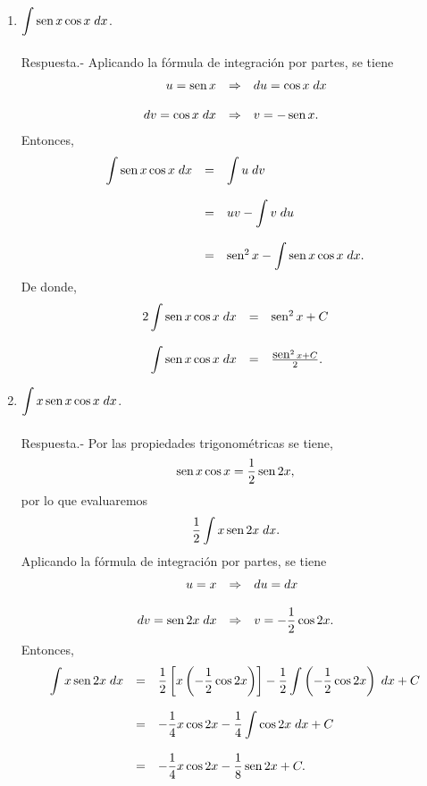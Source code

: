 \begin{enumerate}[\bfseries 1.]
	\item $\displaystyle\int \mathop{\mbox{\normalfont sen}}\nolimits x\cos x\; dx$.\\\\
	    Respuesta.-\; Aplicando la fórmula de integración por partes, se tiene
	    $$\begin{array}{rcl}
		u=\mathop{\mbox{\normalfont sen}}\nolimits x &\Rightarrow& du=\cos x\; dx\\\\
		dv=\cos x\; dx &\Rightarrow& v=-\mathop{\mbox{\normalfont sen}}\nolimits x.
	    \end{array}$$
	    Entonces,
	    $$\begin{array}{rcl}
		\displaystyle\int \mathop{\mbox{\normalfont sen}}\nolimits x\cos x\; dx &=& \displaystyle\int u\; dv\\\\
					       &=& uv - \displaystyle\int v\; du\\\\
					       &=& \mathop{\mbox{\normalfont sen}}\nolimits^2 x - \displaystyle\int \mathop{\mbox{\normalfont sen}}\nolimits x \cos x\; dx.
	    \end{array}$$
	    De donde,
	    $$\begin{array}{rcl}
		2\displaystyle\int \mathop{\mbox{\normalfont sen}}\nolimits x\cos x\; dx &=& \mathop{\mbox{\normalfont sen}}\nolimits^2 x +C \\\\
		\displaystyle\int \mathop{\mbox{\normalfont sen}}\nolimits x\cos x\; dx &=& \frac{\mathop{\mbox{\normalfont sen}}\nolimits^2 x+C}{2}.
	    \end{array}$$
	    \vspace{0.5cm}

	\item $\displaystyle\int x\mathop{\mbox{\normalfont sen}}\nolimits x \cos x\; dx$.\\\\
	    Respuesta.-\; Por las propiedades trigonométricas se tiene,
	    $$\mathop{\mbox{\normalfont sen}}\nolimits x \cos x = \dfrac{1}{2}\mathop{\mbox{\normalfont sen}}\nolimits 2x,$$
	    por lo que evaluaremos 
	    $$\dfrac{1}{2}\int x\mathop{\mbox{\normalfont sen}}\nolimits 2x\; dx.$$
	    Aplicando la fórmula de integración por partes, se tiene
	    $$\begin{array}{rcl}
		u=x &\Rightarrow& du=dx\\\\
		dv=\mathop{\mbox{\normalfont sen}}\nolimits 2x\; dx &\Rightarrow& v=-\dfrac{1}{2}\cos 2x.
	    \end{array}$$
	    Entonces,
	    $$\begin{array}{rcl}
		\displaystyle\int x\mathop{\mbox{\normalfont sen}}\nolimits 2x\; dx &=& \dfrac{1}{2}\left[x\left(-\dfrac{1}{2}\cos 2x\right)\right]- \dfrac{1}{2}\displaystyle\int \left(-\dfrac{1}{2}\cos 2 x\right)\; dx+C\\\\
					       &=& -\dfrac{1}{4}x\cos 2x - \dfrac{1}{4}\displaystyle\int \cos 2x\; dx+C\\\\
					       &=& -\dfrac{1}{4}x\cos 2x - \dfrac{1}{8}\mathop{\mbox{\normalfont sen}}\nolimits 2x + C.
	    \end{array}$$
	    \vspace{0.5cm}


\end{enumerate}

